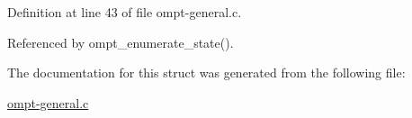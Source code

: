 Definition at line 43 of file ompt-\/general.\-c.



Referenced by ompt\-\_\-enumerate\-\_\-state().



The documentation for this struct was generated from the following file\-:\begin{DoxyCompactItemize}
\item 
\hyperlink{ompt-general_8c}{ompt-\/general.\-c}\end{DoxyCompactItemize}
